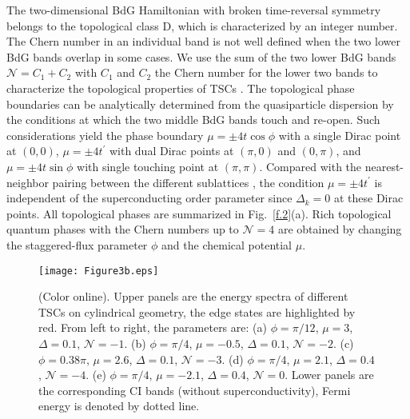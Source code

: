 \documentclass[12pt]{iopart}
\begin{document}
The two-dimensional BdG Hamiltonian with broken time-reversal symmetry belongs to the topological class D, which is characterized by an integer number\cite{Altland-PRB1997,Schnyder-PRB2008}. The Chern number in an individual band is not well defined when the two lower BdG bands overlap in some cases. We use the sum of the two lower BdG bands $\mathcal{N}=C_{1}+C_{2}$ with $C_{1}$ and $C_{2}$ the Chern number for the lower two bands to characterize the topological properties of TSCs \cite{Qi-PRB2010,Liu-SR2016}. The topological phase boundaries can be analytically determined from the quasiparticle dispersion by the conditions at which the two middle BdG bands touch and re-open. Such considerations yield the phase boundary $\mu=\pm 4t\cos \phi$ with a single Dirac point at $(0,0)$, $\mu=\pm 4t^{\prime}$ with dual Dirac points at $(\pi,0)$ and $(0,\pi)$, and $\mu=\pm 4t\sin\phi$ with single touching point at $(\pi,\pi)$. Compared with the nearest-neighbor pairing between the different sublattices \cite{Liu-SR2016}, the condition $\mu=\pm 4t^{\prime}$ is independent of the superconducting order parameter since $\Delta_{k}=0$ at these Dirac points. All topological phases are summarized in Fig.~\ref{f.2}(a). Rich topological quantum phases with the Chern numbers up to $\mathcal{N}=4$ are obtained by changing the staggered-flux parameter $\phi$ and the chemical potential $\mu$.

\begin{figure}[!htb] 
{
\texttt{[image: Figure3b.eps]}}
\caption{(Color online). Upper panels are the energy spectra of different TSCs on cylindrical geometry, the edge states are highlighted by red. From left to right, the parameters are: (a) $\phi=\pi/12$, $\mu=3$, $\Delta=0.1$, $\mathcal{N}=-1$. (b) $\phi=\pi/4$, $\mu=-0.5$, $\Delta=0.1$, $\mathcal{N}=-2$. (c) $\phi=0.38\pi$, $\mu=2.6$, $\Delta=0.1$, $\mathcal{N}=-3$. (d) $\phi=\pi/4$, $\mu=2.1$, $\Delta=0.4$, $\mathcal{N}=-4$. (e) $\phi=\pi/4$, $\mu=-2.1$, $\Delta=0.4$, $\mathcal{N}=0$. Lower panels are the corresponding CI bands (without superconductivity), Fermi energy is denoted by dotted line.}\label{f.3}
\end{figure}
\end{document}
